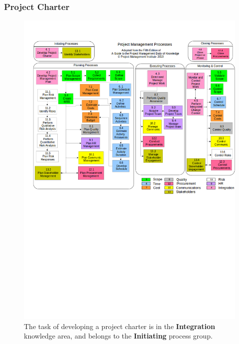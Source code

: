 \documentclass{beamer}
\begin{document}
\begin{frame}
\frametitle{Project Charter}
\begin{figure}
\caption{The task of developing a project charter is in the \textbf{Integration} knowledge area, and belongs to the \textbf{Initiating} process group.}
\vspace{-0.8cm}
\includegraphics[scale=0.3]{mapping}
\end{figure}
\end{frame}
\end{document}
